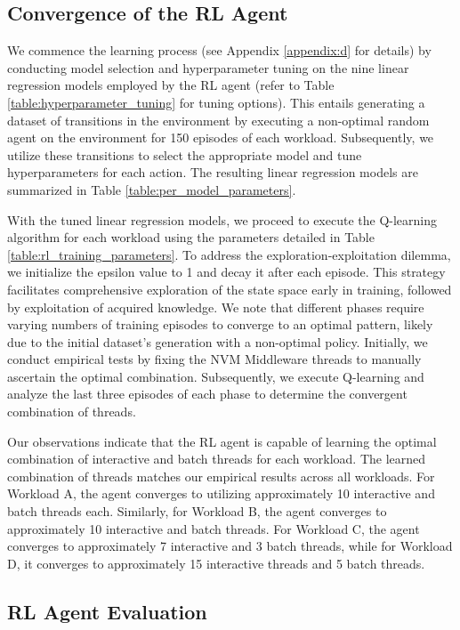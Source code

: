 \subsection*{Convergence of the RL Agent}

We commence the learning process (see Appendix \ref{appendix:d} for details) by conducting model selection and hyperparameter tuning on the nine linear regression models employed by the RL agent (refer to Table \ref{table:hyperparameter_tuning} for tuning options). This entails generating a dataset of transitions in the environment by executing a non-optimal random agent on the environment for 150 episodes of each workload. Subsequently, we utilize these transitions to select the appropriate model and tune hyperparameters for each action. The resulting linear regression models are summarized in Table \ref{table:per_model_parameters}.

With the tuned linear regression models, we proceed to execute the Q-learning algorithm for each workload using the parameters detailed in Table \ref{table:rl_training_parameters}. To address the exploration-exploitation dilemma, we initialize the epsilon value to 1 and decay it after each episode. This strategy facilitates comprehensive exploration of the state space early in training, followed by exploitation of acquired knowledge. We note that different phases require varying numbers of training episodes to converge to an optimal pattern, likely due to the initial dataset's generation with a non-optimal policy. Initially, we conduct empirical tests by fixing the NVM Middleware threads to manually ascertain the optimal combination. Subsequently, we execute Q-learning and analyze the last three episodes of each phase to determine the convergent combination of threads.

Our observations indicate that the RL agent is capable of learning the optimal combination of interactive and batch threads for each workload. The learned combination of threads matches our empirical results across all workloads. For Workload A, the agent converges to utilizing approximately 10 interactive and batch threads each. Similarly, for Workload B, the agent converges to approximately 10 interactive and batch threads. For Workload C, the agent converges to approximately 7 interactive and 3 batch threads, while for Workload D, it converges to approximately 15 interactive threads and 5 batch threads.

\subsection*{RL Agent Evaluation}

